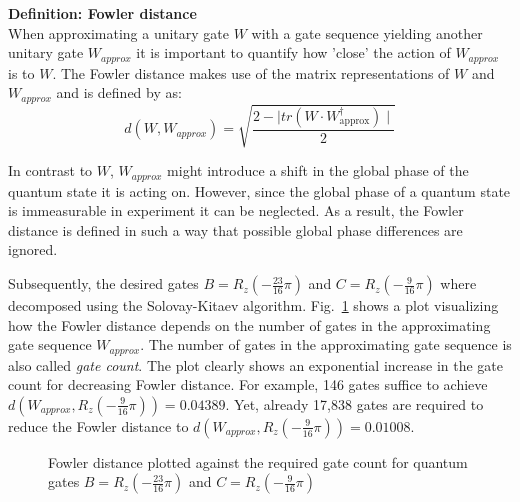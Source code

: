 
\begin{redbox}
\textbf{Definition: Fowler distance}\\
\newline
When approximating a unitary gate $W$ with a gate sequence yielding another unitary gate $W_{approx}$ it is important to quantify how 'close' the action of $W_{approx}$ is to $W$. The Fowler distance makes use of the matrix representations of $W$ and $W_{approx}$ and is defined by  as:
\begin{equation}
d(W,W_{approx}) = \sqrt{\frac{2-\mid tr(W\cdot W_{\mathrm{approx}}^\dagger)\mid}{2}}
\end{equation}

In contrast to $W$, $W_{approx}$ might introduce a shift in the global phase of the quantum state it is acting on. However, since the global phase of a quantum state is immeasurable in experiment it can be neglected. As a result, the Fowler distance is defined in such a way that possible global phase differences are ignored.
\end{redbox}

Subsequently, the desired gates $B = R_z(-\frac{23}{16}\pi)$ and $C = R_z(-\frac{9}{16}\pi)$ where decomposed using the Solovay-Kitaev algorithm. Fig.~\ref{fig:skresultplot} shows a plot visualizing how the Fowler distance depends on the number of gates in the approximating gate sequence $W_{approx}$. The number of gates in the approximating gate sequence is also called \emph{gate count}. The plot clearly shows an exponential increase in the gate count for decreasing Fowler distance. For example, 146 gates suffice to achieve $d(W_{approx},R_z(-\frac{9}{16}\pi)) = 0.04389$. Yet, already 17,838 gates are required to reduce the Fowler distance to $d(W_{approx},R_z(-\frac{9}{16}\pi)) = 0.01008$.

\begin{figure}[H]
\centering
\caption{Fowler distance plotted against the required gate count for quantum gates $B = R_z(-\frac{23}{16}\pi)$ and $C = R_z(-\frac{9}{16}\pi)$ }
\label{fig:skresultplot}
  \end{figure}
  
